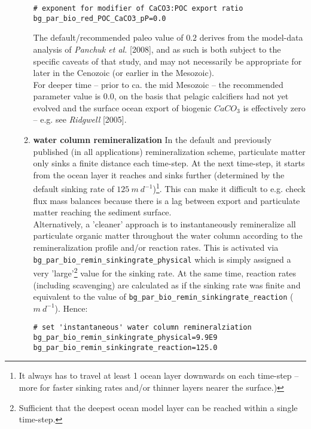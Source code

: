 \documentclass[11pt,fleqn]{book} %
\begin{document}
\begin{itemize}[noitemsep]
\begin{enumerate}[noitemsep]
\begin{verbatim}
# exponent for modifier of CaCO3:POC export ratio
bg_par_bio_red_POC_CaCO3_pP=0.0
\end{verbatim}\vspace{-1mm}\normalsize
The default/recommended paleo value of \(0.2\) derives from the model-data analysis of \textit{Panchuk et al.} [2008], and as such is both subject to the specific caveats of that study, and may not necessarily be appropriate for later in the Cenozoic (or earlier in the Mesozoic).
\\For deeper time -- prior to ca. the mid Mesozoic -- the recommended parameter value is \(0.0\), on the basis that pelagic calcifiers had not yet evolved and the surface ocean export of biogenic \(CaCO_{3}\) is effectively zero -- e.g. see \textit{Ridgwell} [2005].
\vspace{1mm}
\item \textbf{water column remineralization}
In the default and previously published (in all applications) remineralization scheme, particulate matter only sinks a finite distance each time-step. At the next time-step, it starts from the ocean layer it reaches and sinks further (determined by the default sinking rate of \(125\:m\:d^{-1}\))\footnote{It always has to travel at least 1 ocean layer downwards on each time-step -- more for faster sinking rates and/or thinner layers nearer the surface.)}. This can make it difficult to e.g. check flux mass balances because there is a lag between export and particulate matter reaching the sediment surface.
\\Alternatively, a 'cleaner' approach is to instantaneously remineralize all particulate organic matter throughout the water column according to the remineralization profile and/or reaction rates. This is activated via \texttt{bg\_par\_bio\_remin\_sinkingrate\_physical} which is simply assigned a very 'large'\footnote{Sufficient that the deepest ocean model layer can be reached within a single time-step.} value for the sinking rate. At the same time, reaction rates (including scavenging) are calculated as if the sinking rate was finite and equivalent to the value of \texttt{bg\_par\_bio\_remin\_sinkingrate\_reaction} (\(m\:d^{-1}\)). Hence:
\small\vspace{-1mm}\begin{verbatim}
# set 'instantaneous' water column remineralziation
bg_par_bio_remin_sinkingrate_physical=9.9E9
bg_par_bio_remin_sinkingrate_reaction=125.0
\end{verbatim}\vspace{-1mm}\normalsize

\end{enumerate}
\end{itemize}
\end{document}
